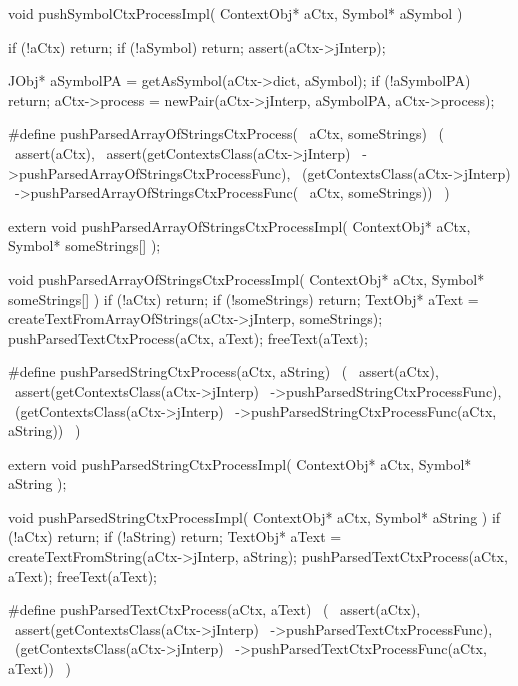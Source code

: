 \startCCode
void pushSymbolCtxProcessImpl(
  ContextObj* aCtx,
  Symbol* aSymbol
) {
  if (!aCtx) return;
  if (!aSymbol) return;
  assert(aCtx->jInterp);

  JObj* aSymbolPA = getAsSymbol(aCtx->dict, aSymbol);
  if (!aSymbolPA) return;
  aCtx->process = newPair(aCtx->jInterp, aSymbolPA, aCtx->process);
}
\stopCCode

\startCHeader
#define pushParsedArrayOfStringsCtxProcess(      \
  aCtx, someStrings)                             \
  (                                              \
    assert(aCtx),                                \
    assert(getContextsClass(aCtx->jInterp)       \
      ->pushParsedArrayOfStringsCtxProcessFunc), \
    (getContextsClass(aCtx->jInterp)             \
      ->pushParsedArrayOfStringsCtxProcessFunc(  \
        aCtx, someStrings))                      \
  )
\stopCHeader

\setCHeaderStream{private}
\startCHeader
extern void pushParsedArrayOfStringsCtxProcessImpl(
  ContextObj* aCtx,
  Symbol* someStrings[]
);
\stopCHeader
{}

\startCCode
void pushParsedArrayOfStringsCtxProcessImpl(
  ContextObj* aCtx,
  Symbol* someStrings[]
) {
  if (!aCtx) return;
  if (!someStrings) return;
  TextObj* aText =
    createTextFromArrayOfStrings(aCtx->jInterp, someStrings);
  pushParsedTextCtxProcess(aCtx, aText);
  freeText(aText);
}
\stopCCode

\startCHeader
#define pushParsedStringCtxProcess(aCtx, aString)      \
  (                                                    \
    assert(aCtx),                                      \
    assert(getContextsClass(aCtx->jInterp)             \
      ->pushParsedStringCtxProcessFunc),               \
    (getContextsClass(aCtx->jInterp)                   \
      ->pushParsedStringCtxProcessFunc(aCtx, aString)) \
  )
\stopCHeader

\setCHeaderStream{private}
\startCHeader
extern void pushParsedStringCtxProcessImpl(
  ContextObj* aCtx,
  Symbol* aString
);
\stopCHeader
\setCHeaderStream{public}

\startCCode
void pushParsedStringCtxProcessImpl(
  ContextObj* aCtx,
  Symbol* aString
) {
  if (!aCtx) return;
  if (!aString) return;
  TextObj* aText =
    createTextFromString(aCtx->jInterp, aString);
  pushParsedTextCtxProcess(aCtx, aText);
  freeText(aText);
}
\stopCCode

\startCHeader
#define pushParsedTextCtxProcess(aCtx, aText)      \
  (                                                \
    assert(aCtx),                                  \
    assert(getContextsClass(aCtx->jInterp)         \
      ->pushParsedTextCtxProcessFunc),             \
    (getContextsClass(aCtx->jInterp)               \
      ->pushParsedTextCtxProcessFunc(aCtx, aText)) \
  )
\stopCHeader

